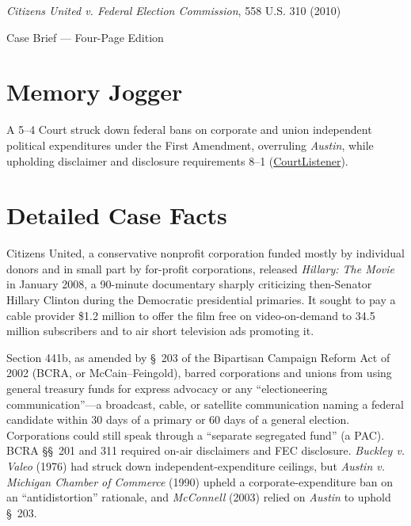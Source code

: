 \documentclass[12pt]{article}
\begin{document}
\begin{center}
{\LARGE \textit{Citizens United v. Federal Election Commission}, 558 U.S. 310 (2010)\par}
\vspace{0.8em}
{\large Case Brief --- Four-Page Edition\par}
\end{center}
\vspace{1em}

\section{Memory Jogger}

A 5--4 Court struck down federal bans on corporate and union independent political expenditures under the First Amendment, overruling \textit{Austin}, while upholding disclaimer and disclosure requirements 8--1 (\href{https://www.courtlistener.com/opinion/1741/citizens-united-v-federal-election-commission/}{CourtListener}).

\section{Detailed Case Facts}

Citizens United, a conservative nonprofit corporation funded mostly by individual donors and in small part by for-profit corporations, released \textit{Hillary: The Movie} in January 2008, a 90-minute documentary sharply criticizing then-Senator Hillary Clinton during the Democratic presidential primaries. It sought to pay a cable provider \$1.2 million to offer the film free on video-on-demand to 34.5 million subscribers and to air short television ads promoting it.

Section 441b, as amended by \S~203 of the Bipartisan Campaign Reform Act of 2002 (BCRA, or McCain--Feingold), barred corporations and unions from using general treasury funds for express advocacy or any ``electioneering communication''---a broadcast, cable, or satellite communication naming a federal candidate within 30 days of a primary or 60 days of a general election. Corporations could still speak through a ``separate segregated fund'' (a PAC). BCRA \S\S~201 and 311 required on-air disclaimers and FEC disclosure. \textit{Buckley v. Valeo} (1976) had struck down independent-expenditure ceilings, but \textit{Austin v. Michigan Chamber of Commerce} (1990) upheld a corporate-expenditure ban on an ``antidistortion'' rationale, and \textit{McConnell} (2003) relied on \textit{Austin} to uphold \S~203.
\end{document}
